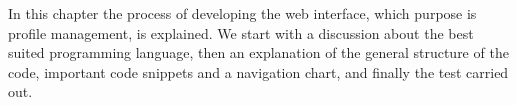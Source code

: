 In this chapter the process of developing the web interface, which purpose is profile management, is explained. We start with a discussion about the best suited programming language, then an explanation of the general structure of the code, important code snippets and a navigation chart, and finally the test carried out.